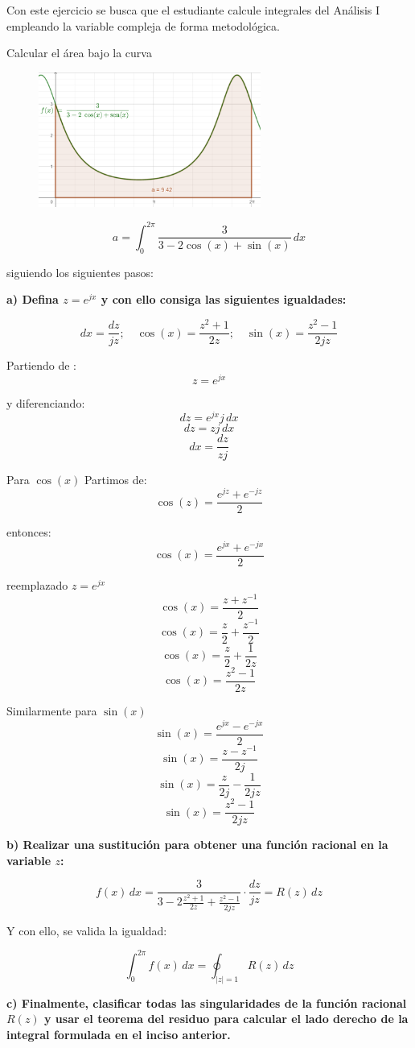 \documentclass[12pt]{report}
\begin{document}
Con este ejercicio se busca que el estudiante calcule integrales del Análisis I empleando la variable
compleja de forma metodológica.

Calcular el área bajo la curva\\


\begin{figure}[h] %
    \centering %
    \includegraphics[width=0.65\textwidth]{./Imagenes/foto1Ej7.png} %
\end{figure}

$$a = \int_{0}^{2\pi} \frac{3}{3 - 2\cos(x) + \sin(x)} \, dx$$

siguiendo los siguientes pasos:

\textbf{a)  Defina $z = e^{jx}$ y con ello consiga las siguientes igualdades:}

$$dx = \frac{dz}{jz}; \quad \cos(x) = \frac{z^{2} + 1}{2z}; \quad \sin(x) = \frac{z^{2} - 1}{2jz}$$

Partiendo de :
$$z = e^{jx}$$

y diferenciando:
$$dz = e^{jx}j \, dx$$
$$dz = zj \, dx$$
$$dx = \frac{dz}{zj}$$

Para $\cos(x)$
Partimos de:
$$\cos(z)=\frac{e^{jz}+e^{-jz}}{2}$$

entonces:
$$\cos(x)=\frac{e^{jx}+e^{-jx}}{2}$$

reemplazado $z=e^{jx}$
$$\cos(x)=\frac{z+z^{-1}}{2}$$
$$\cos(x)=\frac{z}{2}+\frac{z^{-1}}{2}$$
$$\cos(x)=\frac{z}{2}+\frac{1}{2z}$$
$$\cos(x)=\frac{z^2-1}{2z}$$

Similarmente para $\sin(x)$
$$\sin(x)=\frac{e^{jx}-e^{-jx}}{2}$$
$$\sin(x)=\frac{z-z^{-1}}{2j}$$
$$\sin(x)=\frac{z}{2j}-\frac{1}{2jz}$$
$$\sin(x)=\frac{z^2-1}{2jz}$$

\textbf{b)  Realizar una sustitución para obtener una función racional en la variable $z$:}

$$ f(x) \, dx = \frac{3}{3 - 2\frac{z^{2} + 1}{2z} + \frac{z^{2} - 1}{2jz}} \cdot \frac{dz}{jz} = R(z) \, dz $$ 

Y con ello, se valida la igualdad:

$$ \int_{0}^{2\pi} f(x) \, dx = \oint_{|z|=1} R(z) \, dz$$ 


\textbf{c)  Finalmente, clasificar todas las singularidades de la función racional $R(z)$ y usar el teorema del residuo para calcular el lado derecho de la integral formulada en el inciso anterior.}
\end{document}
